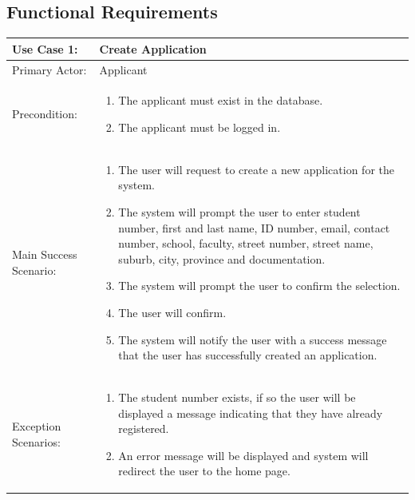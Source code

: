 \documentclass{article}
\begin{document}
\subsection{Functional Requirements}
\begin{tabular} {| m{5cm} | m{10cm} |}
\hline
Use Case 1: & Create Application \\
\hline
Primary Actor: & Applicant \\
\hline
Precondition: & \begin{enumerate} \itemsep0em \item The applicant must exist in the database.
\item The applicant must be logged in. 
\end{enumerate} \\
\hline
Main Success Scenario: & \begin{enumerate} \itemsep0em \item The user will request to create a new application for the system. 
\item The system will prompt the user to enter student number, first and last name, ID number, email, contact number, school, faculty, street number, street name, suburb, city, province and documentation.
\item The system will prompt the user to confirm the selection.
\item The user will confirm.
\item The system will notify the user with a success message that the user has successfully created an application.
\end{enumerate}\\
\hline
Exception Scenarios: & \begin{enumerate}
\itemsep0em \item The student number exists, if so the user will be displayed a message indicating that they have already registered.
\item An error message will be displayed and system will redirect the user to the home page.
\end{enumerate} \\
\hline
\end{tabular}
\\ \\ \\ \\
\end{document}
